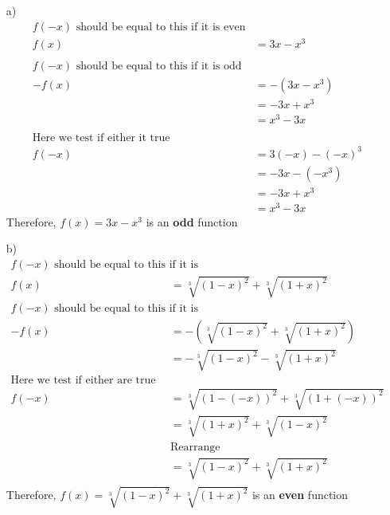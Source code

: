 \documentclass[11pt]{article}
\begin{document}
\begin{enumerate}

  \item[a)] \begin{align*}
\textrm{\(f(-x)\) should be equal to this if it is even}\\
f(x) &= 3x-x^{3} \\
& \\
\textrm{\(f(-x)\) should be equal to this if it is odd} \\
-f(x) &= -(3x-x^{3})\\
&= -3x+x^{3} \\
&= x^{3}-3x \\
&  \\
\textrm{Here we test if either it true} \\
f(-x) &= 3(-x)-(-x)^{3}   \\
&= -3x-(-x^3) \\
&= -3x+x^3 \\
&= x^3-3x
\end{align*}
Therefore, \(f(x) = 3x-x^{3}\) is an \textbf{odd} function

  \item[b)] \begin{align*}
\textrm{\(f(-x)\) should be equal to this if it is even} \\
 f(x) &= \sqrt[3]{(1-x)^{2}} + \sqrt[3]{(1+x)^2} \\
 \textrm{\(f(-x)\) should be equal to this if it is odd} \\
 -f(x) &= -\left(\sqrt[3]{(1-x)^2} + \sqrt[3]{(1+x)^2}\right)\\
 &= - \sqrt[3]{(1-x)^2} - \sqrt[3]{(1+x)^2}\\
 \textrm{Here we test if either are true}\\
 f(-x) &= \sqrt[3]{(1-(-x))^{2}} + \sqrt[3]{(1+(-x))^2} \\
 &= \sqrt[3]{(1+x)^{2}} + \sqrt[3]{(1-x)^2} \\
 &\textrm{Rearrange} \\
 &= \sqrt[3]{(1-x)^{2}} + \sqrt[3]{(1+x)^2} \\
\end{align*}
Therefore, \(f(x) = \sqrt[3]{(1-x)^{2}} + \sqrt[3]{(1+x)^2}\) is an \textbf{even} function
\end{enumerate}
\end{document}
